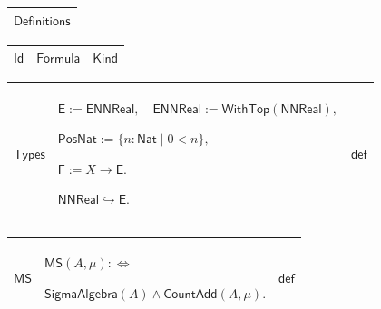 \documentclass[11pt]{amsart}
\renewcommand{\arraystretch}{1.4}
\newlength{\FTCOneColumnBody}
\newlength{\FTCThreeColumnBody}
\begin{document}
{\centering
\renewcommand{\arraystretch}{1.4}
\par\setlength{\parskip}{0pt}\nointerlineskip
\noindent
\begin{tabular}{|@{}>{\centering\arraybackslash}m{\FTCOneColumnBody}|}\hline
$\displaystyle \textsf{Definitions}$\\ \hline
\end{tabular}%
\par\setlength{\parskip}{0pt}\nointerlineskip
\noindent
\begin{tabular}{|@{}>{\centering\arraybackslash}m{0.251968\FTCThreeColumnBody}|>{\centering\arraybackslash}m{0.590551\FTCThreeColumnBody}|>{\centering\arraybackslash}m{0.157480\FTCThreeColumnBody}|}\hline
$\displaystyle \textsf{Id}$ & $\displaystyle \textsf{Formula}$ & $\displaystyle \textsf{Kind}$\\ \hline
\end{tabular}%
\par\setlength{\parskip}{0pt}\nointerlineskip
\noindent
\begin{tabular}{|@{}>{\centering\arraybackslash}m{0.251968\FTCThreeColumnBody}|>{\centering\arraybackslash}m{0.590551\FTCThreeColumnBody}|>{\centering\arraybackslash}m{0.157480\FTCThreeColumnBody}|}\hline
\hypertarget{def:Types}{$\displaystyle \textsf{Types}$} & $\displaystyle \textsf{E}:=\textsf{ENNReal},\quad\textsf{ENNReal}:=\textsf{WithTop}(\textsf{NNReal}),$\par
$\displaystyle \textsf{PosNat}:=\{n:\textsf{Nat}\mid 0<n\},$\par
$\displaystyle \textsf{F}:=X\to\textsf{E}.$\par
$\displaystyle \textsf{NNReal}\hookrightarrow\textsf{E}.$ & $\displaystyle \textsf{def}$\\ \hline
\end{tabular}%
\par\setlength{\parskip}{0pt}\nointerlineskip
\noindent
\begin{tabular}{|@{}>{\centering\arraybackslash}m{0.251968\FTCThreeColumnBody}|>{\centering\arraybackslash}m{0.590551\FTCThreeColumnBody}|>{\centering\arraybackslash}m{0.157480\FTCThreeColumnBody}|}\hline
\hypertarget{def:MS}{$\displaystyle \textsf{MS}$} & $\displaystyle \textsf{MS}(A,\mu):\Longleftrightarrow$\par
$\displaystyle \textsf{SigmaAlgebra}(A)\land\textsf{CountAdd}(A,\mu).$ & $\displaystyle \textsf{def}$\\ \hline
\end{tabular}%
\par\setlength{\parskip}{0pt}\nointerlineskip
}
\end{document}
